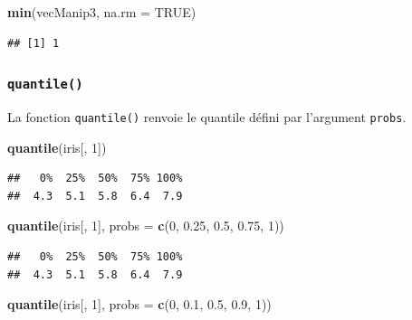 \documentclass[]{book}
\newenvironment{Shaded}{\begin{snugshade}}{\end{snugshade}}
\newcommand{\DataTypeTok}[1]{\textcolor[rgb]{0.13,0.29,0.53}{#1}}
\newcommand{\DecValTok}[1]{\textcolor[rgb]{0.00,0.00,0.81}{#1}}
\newcommand{\FloatTok}[1]{\textcolor[rgb]{0.00,0.00,0.81}{#1}}
\newcommand{\KeywordTok}[1]{\textcolor[rgb]{0.13,0.29,0.53}{\textbf{#1}}}
\newcommand{\NormalTok}[1]{#1}
\newcommand{\OtherTok}[1]{\textcolor[rgb]{0.56,0.35,0.01}{#1}}
\begin{document}
\begin{Shaded}
\begin{Highlighting}[]
\KeywordTok{min}\NormalTok{(vecManip3, }\DataTypeTok{na.rm =} \OtherTok{TRUE}\NormalTok{)}
\end{Highlighting}
\end{Shaded}

\begin{verbatim}
## [1] 1
\end{verbatim}

\hypertarget{l015quantile}{%
\subsubsection{\texorpdfstring{\texttt{quantile()}}{quantile()}}\label{l015quantile}}

La fonction \texttt{quantile()} renvoie le quantile défini par l'argument \texttt{probs}.

\begin{Shaded}
\begin{Highlighting}[]
\KeywordTok{quantile}\NormalTok{(iris[, }\DecValTok{1}\NormalTok{])}
\end{Highlighting}
\end{Shaded}

\begin{verbatim}
##   0%  25%  50%  75% 100% 
##  4.3  5.1  5.8  6.4  7.9
\end{verbatim}

\begin{Shaded}
\begin{Highlighting}[]
\KeywordTok{quantile}\NormalTok{(iris[, }\DecValTok{1}\NormalTok{], }\DataTypeTok{probs =} \KeywordTok{c}\NormalTok{(}\DecValTok{0}\NormalTok{, }\FloatTok{0.25}\NormalTok{, }\FloatTok{0.5}\NormalTok{, }\FloatTok{0.75}\NormalTok{, }\DecValTok{1}\NormalTok{))}
\end{Highlighting}
\end{Shaded}

\begin{verbatim}
##   0%  25%  50%  75% 100% 
##  4.3  5.1  5.8  6.4  7.9
\end{verbatim}

\begin{Shaded}
\begin{Highlighting}[]
\KeywordTok{quantile}\NormalTok{(iris[, }\DecValTok{1}\NormalTok{], }\DataTypeTok{probs =} \KeywordTok{c}\NormalTok{(}\DecValTok{0}\NormalTok{, }\FloatTok{0.1}\NormalTok{, }\FloatTok{0.5}\NormalTok{, }\FloatTok{0.9}\NormalTok{, }\DecValTok{1}\NormalTok{))}
\end{Highlighting}
\end{Shaded}
\end{document}
